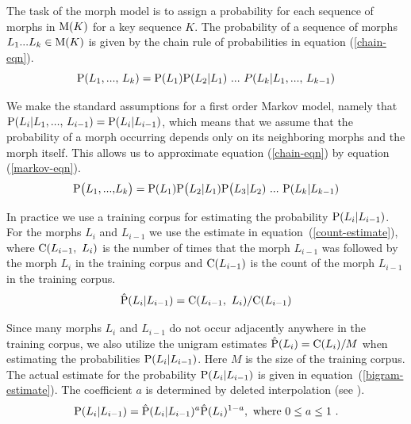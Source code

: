 \documentclass{llncs}
\begin{document}
The task of the morph model is to assign a probability for each
sequence of morphs in ${\rm M}(K)$ for a key sequence $K$. The
probability of a sequence of morphs $L_1{\rm ... }L_k \in {\rm M}(K)$
is given by the chain rule of probabilities in equation
(\ref{chain-eqn}).
\begin{equation}\label{chain-eqn}
{\rm P}(L_1{\rm, ..., }\ L_k) = {\rm P}(L_1){\rm P}(L_2|L_1)\ {\rm
  ... }\ P(L_k| L_1{\rm, ..., }\ L_{k - 1})
\end{equation}

We make the standard assumptions for a first order Markov model,
namely that ${\rm P}(L_i | L_1{\rm, ..., }\ L_{i-1}) = {\rm P}(L_i |
L_{i-1})$, which means that we assume that the probability of a morph
occurring depends only on its neighboring morphs and the morph
itself. This allows us to approximate equation (\ref{chain-eqn}) by
equation (\ref{markov-eqn}).
\begin{equation}\label{markov-eqn}
{\rm P}\big(L_1{\rm, ..., }L_k\big) = {\rm P}(L_1){\rm P}\big(L_2 |
L_1){\rm P}\big(L_3 | L_2)\ {\rm ... }\ {\rm P}(L_{k} | L_{k-1})
\end{equation}

In practice we use a training corpus for estimating the probability
${\rm P}(L_i | L_{i-1})$. For the morphs $L_i$ and $L_{i-1}$ we
use the estimate in equation~(\ref{count-estimate}), where ${\rm
  C}(L_{i-1},\ L_i)$ is the number of times that the morph $L_{i-1}$
was followed by the morph $L_i$ in the training corpus and ${\rm
  C}(L_{i-1})$ is the count of the morph $L_{i-1}$ in the training
corpus.
\begin{equation}\label{count-estimate}
{\rm \hat{P}}(L_i | L_{i-1}) = {\rm C}(L_{i - 1},\ L_i) / {\rm
  C}(L_{i-1})
\end{equation}

Since many morphs $L_i$ and $L_{i-1}$ do not occur adjacently anywhere
in the training corpus, we also utilize the unigram estimates ${\rm
  \hat{P}}(L_i) = {\rm C}(L_i)/M$ when estimating the probabilities
${\rm P}(L_i | L_{i-1})$. Here $M$ is the size of the training
corpus. The actual estimate for the probability ${\rm P}(L_i |
L_{i-1})$ is given in equation~(\ref{bigram-estimate}). The
coefficient $a$ is determined by deleted interpolation (see
\cite{Brants:2000}).
\begin{equation}\label{bigram-estimate}
{\rm P}(L_i | L_{i-1}) = {\rm \hat{P}}(L_i | L_{i-1})^a{\rm
  \hat{P}}(L_i)^{1 - a}{\rm,\ where }\ 0\leq a \leq 1\ {\rm.}
\end{equation}
\end{document}
